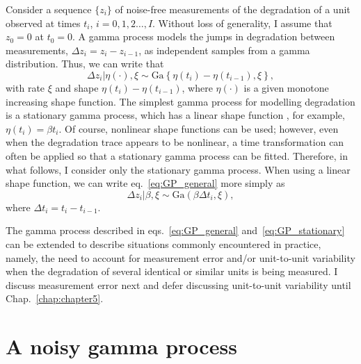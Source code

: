 Consider a sequence $\{z_i\}$ of noise-free measurements of the degradation of a unit observed at times $t_i$, $i = 0, 1, 2 \ldots, I$. Without loss of generality, I assume that $z_0 = 0$ at $t_0 = 0$. A gamma process \citep{lawless2004} models the jumps in degradation between measurements, $\Delta z_i = z_i - z_{i-1}$, as independent samples from a gamma distribution. Thus, we can write that
\begin{equation} \label{eq:GP_general}
  \Delta z_i|\eta(\cdot), \xi \sim \mbox{Ga} \left\{ \eta(t_i) - \eta(t_{i-1}), \xi \right\},
\end{equation}
with rate $\xi$ and shape $\eta(t_i) - \eta(t_{i-1})$, where $\eta(\cdot)$ is a given monotone increasing shape function. The simplest gamma process for modelling degradation is a stationary gamma process, which has a linear shape function \citep{frenk2007}, for example, $\eta(t_i) = \beta t_i$. Of course, nonlinear shape functions can be used; however, even when the degradation trace appears to be nonlinear, a time transformation can often be applied so that a stationary gamma process can be fitted. Therefore, in what follows, I consider only the stationary gamma process. When using a linear shape function, we can write eq.~\eqref{eq:GP_general} more simply as
\begin{equation} \label{eq:GP_stationary}
  \Delta z_i| \beta, \xi \sim \mbox{Ga} \left( \beta \Delta t_i, \xi \right),
\end{equation}
where $\Delta t_i = t_i - t_{i-1}$.

The gamma process described in eqs.~\eqref{eq:GP_general} and~\eqref{eq:GP_stationary} can be extended to describe situations commonly encountered in practice, namely, the need to account for measurement error and/or unit-to-unit variability when the degradation of several identical or similar units is being measured. I discuss measurement error next and defer discussing unit-to-unit variability until Chap.~\ref{chap:chapter5}.

\section{A noisy gamma process} \label{sec:NGP}

